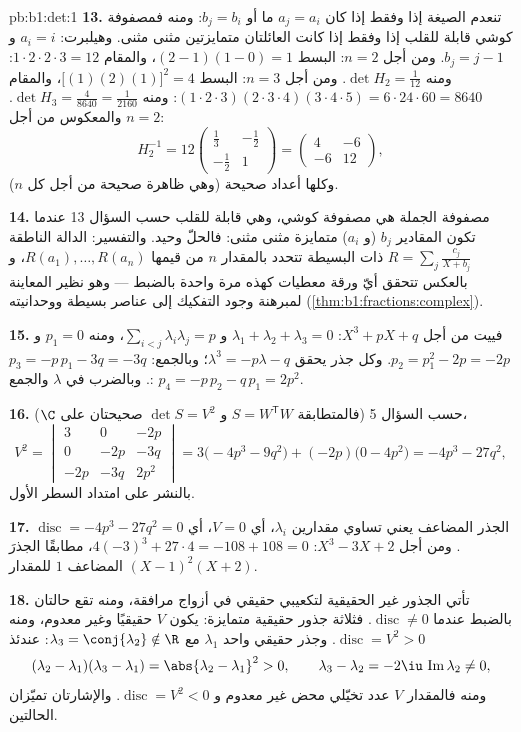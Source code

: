\begin{solution}{pb:b1:det:1}
\textbf{13.} تنعدم الصيغة إذا وفقط إذا كان $a_j = a_i$ ما أو $b_j =
b_i$: ومنه فمصفوفة كوشي قابلة للقلب إذا وفقط إذا كانت العائلتان
متمايزتين مثنى مثنى. وهيلبرت: $a_i = i$ و $b_j = j - 1$. ومن أجل $n =
2$: البسط $(2-1)(1-0) = 1$، والمقام $1\cdot2\cdot2\cdot3
= 12$: ومنه $\det H_2 = \frac1{12}$. ومن أجل $n = 3$: البسط
$\bigl[(1)(2)(1)\bigr]^2 = 4$، والمقام $(1\cdot2\cdot3)
(2\cdot3\cdot4)(3\cdot4\cdot5) = 6\cdot24\cdot60 = 8640$:
ومنه $\det H_3 = \frac{4}{8640} = \frac1{2160}$. والمعكوس من أجل $n = 2$:
\[
H_2^{-1} = 12\begin{pmatrix} \frac13 & -\frac12\\[2pt]
-\frac12 & 1\end{pmatrix}
= \begin{pmatrix} 4 & -6\\ -6 & 12 \end{pmatrix},
\]
وكلها أعداد صحيحة (وهي ظاهرة صحيحة من أجل كل $n$).

\textbf{14.} مصفوفة الجملة هي مصفوفة كوشي،
وهي قابلة للقلب حسب السؤال 13 عندما تكون المقادير $b_j$ (و $a_i$)
متمايزة مثنى مثنى: فالحلّ وحيد. والتفسير: الدالة
الناطقة $R = \sum_j \frac{c_j}{X + b_j}$ ذات  البسيطة
تتحدد بالمقدار $n$ من قيمها $R(a_1), \dots, R(a_n)$، و
بالعكس تتحقق أيّ ورقة معطيات كهذه مرة واحدة بالضبط ---
وهو نظير المعاينة لمبرهنة وجود التفكيك إلى عناصر بسيطة
ووحدانيته (\cref{thm:b1:fractions:complex}).

\textbf{15.} فييت من أجل $X^3 + pX + q$: $\lambda_1 + \lambda_2 +
\lambda_3 = 0$ و $\sum_{i<j}\lambda_i\lambda_j = p$، ومنه $p_1 = 0$
و $p_2 = p_1^2 - 2p = -2p$. وكل جذر يحقق $\lambda^3 =
-p\lambda - q$؛ وبالجمع: $p_3 = -p\,p_1 - 3q = -3q$. وبالضرب
في $\lambda$ والجمع: $p_4 = -p\,p_2 - q\,p_1 = 2p^2$.

\textbf{16.} حسب السؤال 5 (فالمتطابقة $S = W^{\mathsf T}W$
و $\det S = V^2$ صحيحتان على $\C$)،
\[
V^2 = \begin{vmatrix}
3 & 0 & -2p\\
0 & -2p & -3q\\
-2p & -3q & 2p^2
\end{vmatrix}
= 3\bigl(-4p^3 - 9q^2\bigr) + (-2p)\bigl(0 - 4p^2\bigr)
= -4p^3 - 27q^2 ,
\]
بالنشر على امتداد السطر الأول.

\textbf{17.} الجذر المضاعف يعني تساوي مقدارين $\lambda_i$، أي
$V = 0$، أي $\operatorname{disc} = -4p^3 - 27q^2 = 0$. ومن أجل
$X^3 - 3X + 2$: $4(-3)^3 + 27\cdot4 = -108 + 108 = 0$، مطابقًا
الجذرَ المضاعف $1$ للمقدار $(X-1)^2(X+2)$.

\textbf{18.} تأتي الجذور غير الحقيقية لتكعيبي حقيقي في أزواج
مرافقة، ومنه تقع حالتان بالضبط عندما $\operatorname{disc} \neq
0$. فثلاثة جذور حقيقية متمايزة: يكون $V$ حقيقيًا وغير معدوم، ومنه
$\operatorname{disc} = V^2 > 0$. وجذر حقيقي واحد $\lambda_1$ مع
$\lambda_3 = \conj{\lambda_2} \notin \R$: عندئذ
\[
(\lambda_2 - \lambda_1)(\lambda_3 - \lambda_1) =
\abs{\lambda_2 - \lambda_1}^2 > 0,
\qquad
\lambda_3 - \lambda_2 = -2\iu\,\operatorname{Im}\lambda_2 \neq 0,
\]
ومنه فالمقدار $V$ عدد تخيّلي محض غير معدوم و
$\operatorname{disc} = V^2 < 0$. والإشارتان تميّزان
الحالتين.


\end{solution}
